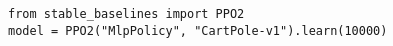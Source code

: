 \documentclass[border=0.5 cm]{standalone}
\begin{document}
\begin{verbatim}
from stable_baselines import PPO2
model = PPO2("MlpPolicy", "CartPole-v1").learn(10000)
\end{verbatim}
\end{document}

